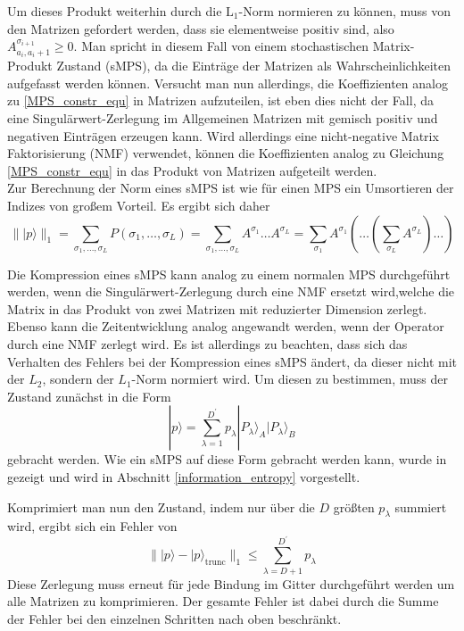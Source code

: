 \documentclass[10pt,a4paper]{report}
\newcommand{\SumIndex}{\sigma_1,\ldots,\sigma_L}
\begin{document}
Um dieses Produkt weiterhin durch die $\text{L}_1$-Norm normieren zu können, muss von den Matrizen gefordert werden, dass sie elementweise positiv sind, also $A_{a_i,a_i+1}^{\sigma_{i+1}}\geq 0$. Man spricht in diesem Fall von einem stochastischen Matrix-Produkt Zustand (sMPS), da die Einträge der Matrizen als Wahrscheinlichkeiten aufgefasst werden können.
Versucht man nun allerdings, die Koeffizienten analog zu \ref{MPS_constr_equ} in Matrizen aufzuteilen, ist eben dies nicht der Fall, da eine Singulärwert-Zerlegung im Allgemeinen Matrizen mit gemisch positiv und negativen Einträgen erzeugen kann. Wird allerdings eine nicht-negative Matrix Faktorisierung (NMF) verwendet, können die Koeffizienten analog zu Gleichung \ref{MPS_constr_equ} in das Produkt von Matrizen aufgeteilt werden.\\

Zur Berechnung der Norm eines sMPS ist wie für einen MPS ein Umsortieren der Indizes von großem Vorteil. Es ergibt sich daher
\begin{equation}
\parallel|p\rangle\parallel_1=\sum_{\SumIndex}P(\SumIndex)=\sum_{\SumIndex}A^{\sigma_1}\ldots A^{\sigma_L}=\sum_{\sigma_1}A^{\sigma_1}(\ldots(\sum_{\sigma_L}A^{\sigma_L})\ldots)
\end{equation}

Die Kompression eines sMPS kann analog zu einem normalen MPS durchgeführt werden, wenn die Singulärwert-Zerlegung durch eine NMF ersetzt wird,welche die Matrix in das Produkt von zwei Matrizen mit reduzierter Dimension zerlegt. Ebenso kann die Zeitentwicklung analog angewandt werden, wenn der Operator durch eine NMF zerlegt wird. Es ist allerdings zu beachten, dass sich das Verhalten des Fehlers bei der Kompression eines sMPS ändert, da dieser nicht mit der $L_2$, sondern der $L_1$-Norm normiert wird. Um diesen zu bestimmen, muss der Zustand zunächst in die Form
\begin{equation}
|p\rangle=\sum_{\lambda=1}^{D^{\prime}}p_{\lambda}|P_{\lambda}\rangle_A|P_{\lambda}\rangle_B
\end{equation}
gebracht werden.\cite{MPS-vs-sMPS} Wie ein sMPS auf diese Form gebracht werden kann, wurde in \cite{sMPS} gezeigt und wird in Abschnitt \ref{information_entropy} vorgestellt.

Komprimiert man nun den Zustand, indem nur über die $D$ größten $p_{\lambda}$ summiert wird, ergibt sich ein Fehler von
\begin{equation}
\parallel|p\rangle-|p\rangle_{\text{trunc}}\parallel_1\leq\sum_{\lambda=D+1}^{D^{\prime}}p_{\lambda}
\end{equation}
Diese Zerlegung muss erneut für jede Bindung im Gitter durchgeführt werden um alle Matrizen zu komprimieren. Der gesamte Fehler ist dabei durch die Summe der Fehler bei den einzelnen Schritten nach oben beschränkt.\\
\end{document}
